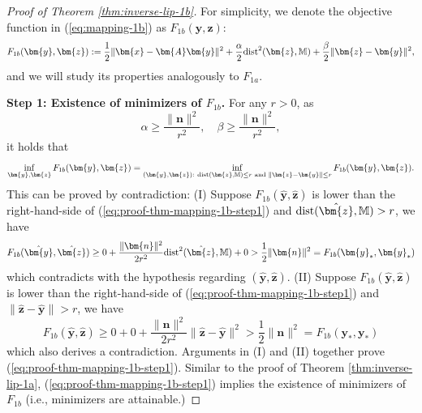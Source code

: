 \documentclass{amsart} %
\def\eqref#1{equation~\ref{#1}}
\def\vn{{\bm{n}}}
\def\vx{{\bm{x}}}
\def\vy{{\bm{y}}}
\def\vz{{\bm{z}}}
\def\mA{{\bm{A}}}
\def\sM{{\mathbb{M}}}
\theoremstyle{definition}
\theoremstyle{remark}
\renewcommand{\eqref}[1]{\textup{(\ref{#1})}}
\begin{document}
\begin{proof}[Proof of Theorem \ref{thm:inverse-lip-1b}] 
For simplicity, we denote the objective function in \eqref{eq:mapping-1b} as $F_{1b}(\vy,\vz)$:
\[ 
F_{1b}(\vy,\vz) := \frac{1}{2}\|\vx - \mA \vy\|^2 + \frac{\alpha}{2} \textup{dist}^2(\vz,\sM) + \frac{\beta}{2} \|\vz-\vy\|^2,
\]
and we will study its properties analogously to $F_{1a}$.

\textbf{Step 1: Existence of minimizers of $F_{1b}$.} For any $r>0$, as 
\[ \alpha \geq \frac{\|\vn\|^2}{r^2}, \quad \beta \geq \frac{\|\vn\|^2}{r^2}, \]
it holds that
\begin{equation}
\label{eq:proof-thm-mapping-1b-step1}
\inf_{\vy,\vz}F_{1b}(\vy,\vz) = \inf_{ (\vy,\vz): ~ \textup{dist}(\vz,\sM)\leq r \textup{ and } \|\vz-\vy\|\leq r }F_{1b}(\vy,\vz).
\end{equation}
This can be proved by contradiction: (I) Suppose $F_{1b}(\hat{\vy},\hat{\vz})$ is lower than the right-hand-side of \eqref{eq:proof-thm-mapping-1b-step1} and $\textup{dist}(\hat\vz,\sM) > r$, we have
\[ F_{1b}(\hat{\vy},\hat{\vz}) \geq 0 + \frac{\|\vn\|^2}{2 r^2} \textup{dist}^2(\hat{\vz},\sM) + 0 > \frac{1}{2} \|\vn\|^2 = F_{1b}(\vy_\ast,\vy_\ast)\]
which contradicts with the hypothesis regarding $(\hat{\vy},\hat{\vz})$. (II)  Suppose $F_{1b}(\hat{\vy},\hat{\vz})$ is lower than the right-hand-side of \eqref{eq:proof-thm-mapping-1b-step1} and $\|\hat{\vz}-\hat{\vy}\| > r$, we have
\[ F_{1b}(\hat{\vy},\hat{\vz}) \geq 0 + 0 + \frac{\|\vn\|^2}{2 r^2}\|\hat{\vz}-\hat{\vy}\|^2  > \frac{1}{2}\|\vn\|^2 = F_{1b}(\vy_\ast,\vy_\ast)\]
which also derives a contradiction. Arguments in (I) and (II) together prove \eqref{eq:proof-thm-mapping-1b-step1}. Similar to the proof of Theorem \ref{thm:inverse-lip-1a}, \eqref{eq:proof-thm-mapping-1b-step1} implies the existence of minimizers of $F_{1b}$ (i.e., minimizers are attainable.)


\end{proof}
\end{document}
